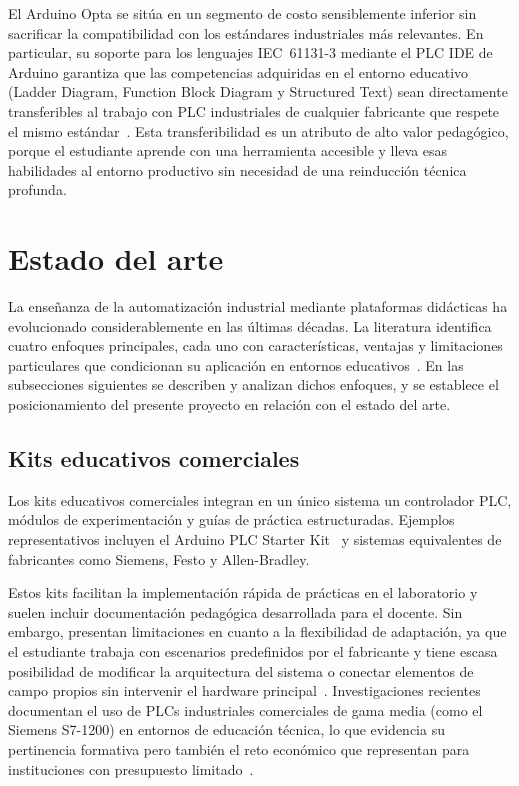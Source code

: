 \documentclass[12pt,a4paper,oneside]{report}
\begin{document}
El Arduino Opta se sitúa en un segmento de costo sensiblemente inferior sin sacrificar la compatibilidad con los estándares industriales más relevantes. En particular, su soporte para los lenguajes IEC~61131-3 mediante el PLC IDE de Arduino garantiza que las competencias adquiridas en el entorno educativo (Ladder Diagram, Function Block Diagram y Structured Text) sean directamente transferibles al trabajo con PLC industriales de cualquier fabricante que respete el mismo estándar~\cite{ref4}. Esta transferibilidad es un atributo de alto valor pedagógico, porque el estudiante aprende con una herramienta accesible y lleva esas habilidades al entorno productivo sin necesidad de una reinducción técnica profunda.

\section{Estado del arte}
\label{sec:estado}

La enseñanza de la automatización industrial mediante plataformas didácticas ha evolucionado considerablemente en las últimas décadas. La literatura identifica cuatro enfoques principales, cada uno con características, ventajas y limitaciones particulares que condicionan su aplicación en entornos educativos~\cite{ref3,ref4,ref5,ref6}. En las subsecciones siguientes se describen y analizan dichos enfoques, y se establece el posicionamiento del presente proyecto en relación con el estado del arte.

\subsection{Kits educativos comerciales}

Los kits educativos comerciales integran en un único sistema un controlador PLC, módulos de experimentación y guías de práctica estructuradas. Ejemplos representativos incluyen el Arduino PLC Starter Kit~\cite{ref2} y sistemas equivalentes de fabricantes como Siemens, Festo y Allen-Bradley.

Estos kits facilitan la implementación rápida de prácticas en el laboratorio y suelen incluir documentación pedagógica desarrollada para el docente. Sin embargo, presentan limitaciones en cuanto a la flexibilidad de adaptación, ya que el estudiante trabaja con escenarios predefinidos por el fabricante y tiene escasa posibilidad de modificar la arquitectura del sistema o conectar elementos de campo propios sin intervenir el hardware principal~\cite{ref3}. Investigaciones recientes documentan el uso de PLCs industriales comerciales de gama media (como el Siemens S7-1200) en entornos de educación técnica, lo que evidencia su pertinencia formativa pero también el reto económico que representan para instituciones con presupuesto limitado~\cite{ref12}.
\end{document}
